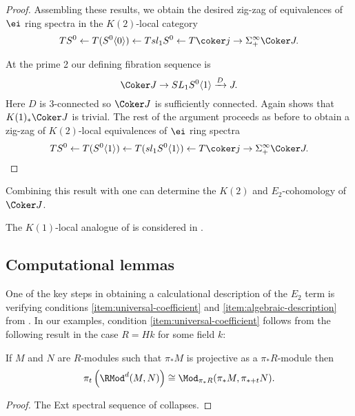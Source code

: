 \documentclass[leqno,oneside,english]{elsarticle}
\begin{document}
\begin{proof}
  Assembling these results, we obtain the desired zig-zag of equivalences of $\ei$
  ring spectra in the $K(2)$-local category
  \[ T S^0 \leftarrow T (S^0\langle 0\rangle) \leftarrow T sl_1 S^0
   \leftarrow T \coker j \rightarrow \Sigma^{\infty}_{+} \Coker J.
  \]

  At the prime 2 our defining fibration sequence is 
  \[
    \Coker J \rightarrow SL_1 S^0 \langle 1 \rangle\xrightarrow{D} J.
  \]
  Here $D$ is 3-connected so $\Coker J$ is sufficiently
  connected. Again \cite[Thm.~2.7]{HoS78} shows that $K(1)_*\Coker J$
  is trivial.   {{\ifshowsaveblocks
{}
\fi}}{}  The rest of the argument proceeds as before to obtain
  a zig-zag of $K(2)$-local equivalences of $\ei$ ring spectra
   \[ T S^0 \leftarrow T (S^0\langle 1\rangle) \leftarrow T (sl_1
   S^0\langle 1 \rangle)
   \leftarrow T \coker j \rightarrow \Sigma^{\infty}_{+} \Coker J.
  \]
\end{proof}

\begin{remark}
  Combining this result with \cite{Kas98, Str98} one can determine the $K(2)$ and $E_2$-cohomology of $\Coker J$.
\end{remark}

\begin{remark}
  The $K(1)$-local analogue of  is
  considered in \cite[\S~3.3]{Noe14}.
\end{remark}

\subsection{Computational lemmas}\label{sec:computational-lemmas}

One of the key steps in obtaining a calculational description of the
$E_2$ term is verifying conditions \eqref{item:universal-coefficient} and \eqref{item:algebraic-description} from . In our examples, condition \eqref{item:universal-coefficient} follows from the following result in the case $R=Hk$ for some field $k$:
\begin{lemma}\label{lem:HR-mod-vs-R-mod-pi-closed}
  If $M$ and $N$ are $R$-modules  such
  that $\pi_*M$ is projective as a $\pi_* R$-module then 
  \[
  \pi_t \left( \RMod^d(M,N) \right) \cong \Mod_{\pi_*R}(\pi_* M, \pi_{*+t}N).
  \]
\end{lemma}
\begin{proof}
  The Ext spectral sequence of \cite[Thm.~IV.4.1]{EKMM97} collapses.
\end{proof} 
\end{document}
